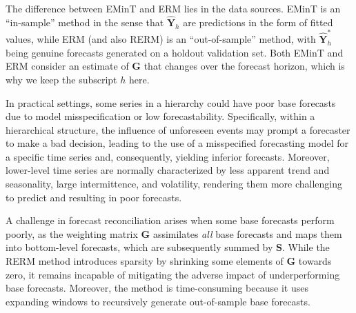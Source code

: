 \documentclass[
  11pt]{article}
\theoremstyle{plain}
\theoremstyle{remark}
\begin{document}
The difference between EMinT and ERM lies in the data sources. EMinT is
an ``in-sample'' method in the sense that \(\hat{\bm{Y}}_{h}\) are
predictions in the form of fitted values, while ERM (and also RERM) is
an ``out-of-sample'' method, with \(\hat{\bm{Y}}_{h}^{*}\) being genuine
forecasts generated on a holdout validation set. Both EMinT and ERM
consider an estimate of \(\bm{G}\) that changes over the forecast
horizon, which is why we keep the subscript \(h\) here.

In practical settings, some series in a hierarchy could have poor base
forecasts due to model misspecification or low forecastability.
Specifically, within a hierarchical structure, the influence of
unforeseen events may prompt a forecaster to make a bad decision,
leading to the use of a misspecified forecasting model for a specific
time series and, consequently, yielding inferior forecasts. Moreover,
lower-level time series are normally characterized by less apparent
trend and seasonality, large intermittence, and volatility, rendering
them more challenging to predict and resulting in poor forecasts.

A challenge in forecast reconciliation arises when some base forecasts
perform poorly, as the weighting matrix \(\bm{G}\) assimilates
\emph{all} base forecasts and maps them into bottom-level forecasts,
which are subsequently summed by \(\bm{S}\). While the RERM method
introduces sparsity by shrinking some elements of \(\bm{G}\) towards
zero, it remains incapable of mitigating the adverse impact of
underperforming base forecasts. Moreover, the method is time-consuming
because it uses expanding windows to recursively generate out-of-sample
base forecasts.
\end{document}
